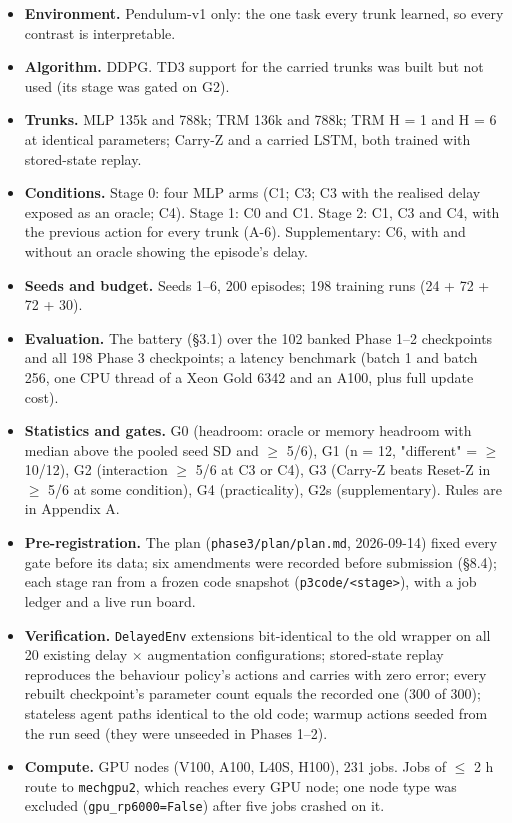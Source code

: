 \documentclass[11pt]{article}
\begin{document}
\begin{itemize}
\item \textbf{Environment.} Pendulum-v1 only: the one task every trunk learned, so every contrast is interpretable.
\item \textbf{Algorithm.} DDPG. TD3 support for the carried trunks was built but not used (its stage was gated on G2).
\item \textbf{Trunks.} MLP 135k and 788k; TRM 136k and 788k; TRM H = 1 and H = 6 at identical parameters; Carry-Z and a carried LSTM, both trained with stored-state replay.
\item \textbf{Conditions.} Stage 0: four MLP arms (C1; C3; C3 with the realised delay exposed as an oracle; C4). Stage 1: C0 and C1. Stage 2: C1, C3 and C4, with the previous action for every trunk (A-6). Supplementary: C6, with and without an oracle showing the episode's delay.
\item \textbf{Seeds and budget.} Seeds 1--6, 200 episodes; 198 training runs (24 + 72 + 72 + 30).
\item \textbf{Evaluation.} The battery (\S{}3.1) over the 102 banked Phase 1--2 checkpoints and all 198 Phase 3 checkpoints; a latency benchmark (batch 1 and batch 256, one CPU thread of a Xeon Gold 6342 and an A100, plus full update cost).
\item \textbf{Statistics and gates.} G0 (headroom: oracle or memory headroom with median above the pooled seed SD and $\geq$ 5/6), G1 (n = 12, "different" = $\geq$ 10/12), G2 (interaction $\geq$ 5/6 at C3 or C4), G3 (Carry-Z beats Reset-Z in $\geq$ 5/6 at some condition), G4 (practicality), G2s (supplementary). Rules are in Appendix A.
\item \textbf{Pre-registration.} The plan (\texttt{phase3/\allowbreak{}plan/\allowbreak{}plan.\allowbreak{}md}, 2026-09-14) fixed every gate before its data; six amendments were recorded before submission (\S{}8.4); each stage ran from a frozen code snapshot (\texttt{p3code/\allowbreak{}<stage>}), with a job ledger and a live run board.
\item \textbf{Verification.} \texttt{DelayedEnv} extensions bit-identical to the old wrapper on all 20 existing delay $\times$ augmentation configurations; stored-state replay reproduces the behaviour policy's actions and carries with zero error; every rebuilt checkpoint's parameter count equals the recorded one (300 of 300); stateless agent paths identical to the old code; warmup actions seeded from the run seed (they were unseeded in Phases 1--2).
\item \textbf{Compute.} GPU nodes (V100, A100, L40S, H100), 231 jobs. Jobs of $\leq$ 2 h route to \texttt{mechgpu2}, which reaches every GPU node; one node type was excluded (\texttt{gpu\_\allowbreak{}rp6000=False}) after five jobs crashed on it.
\end{itemize}
\end{document}
